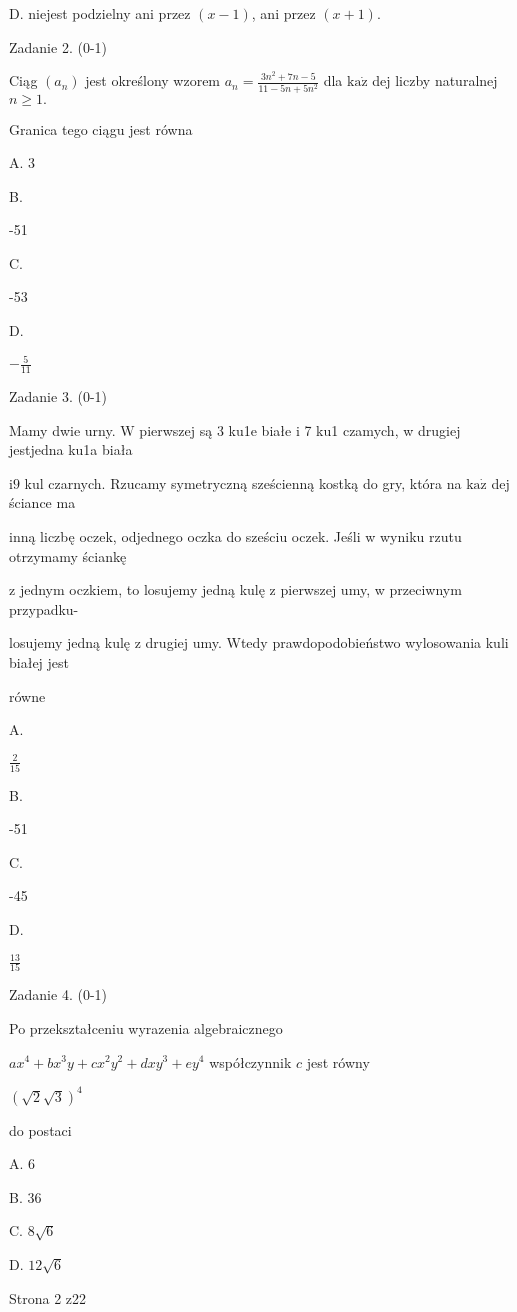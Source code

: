 \documentclass[a4paper,12pt]{article}
\begin{document}
D. niejest podzielny ani przez $(x-1)$, ani przez $(x+1).$

Zadanie 2. (0-1)

Ciąg $(a_{n})$ jest określony wzorem $a_{n}=\displaystyle \frac{3n^{2}+7n-5}{11-5n+5n^{2}}$ dla $\mathrm{k}\mathrm{a}\dot{\mathrm{z}}$ dej liczby naturalnej $n\geq 1.$

Granica tego ciągu jest równa

A. 3

B.

-51

C.

-53

D.

$-\displaystyle \frac{5}{11}$

Zadanie 3. (0-1)

Mamy dwie urny. $\mathrm{W}$ pierwszej są 3 ku1e białe i 7 ku1 czamych, w drugiej jestjedna ku1a biała

$\mathrm{i}9$ kul czarnych. Rzucamy symetryczną sześcienną kostką do gry, która na $\mathrm{k}\mathrm{a}\dot{\mathrm{z}}$ dej ściance ma

inną liczbę oczek, odjednego oczka do sześciu oczek. Jeśli w wyniku rzutu otrzymamy ściankę

z jednym oczkiem, to losujemy jedną kulę z pierwszej umy, w przeciwnym przypadku-

losujemy jedną kulę z drugiej umy. Wtedy prawdopodobieństwo wylosowania kuli białej jest

równe

A.

$\displaystyle \frac{2}{15}$

B.

-51

C.

-45

D.

$\displaystyle \frac{13}{15}$

Zadanie 4. (0-1)

Po przekształceniu wyrazenia algebraicznego

$ax^{4}+bx^{3}y+cx^{2}y^{2}+dxy^{3}+ey^{4}$ współczynnik $c$ jest równy

$(\sqrt{2}\sqrt{3})^{4}$

do postaci

A. 6

B. 36

C. $8\sqrt{6}$

D. $12\sqrt{6}$

Strona 2 z22
\end{document}

